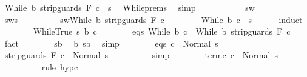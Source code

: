 \begin{isabellebody}
\ {\isachardoublequoteopen}{\isasymGamma}{\isasymturnstile}While\ b\ {\isacharparenleft}strip{\isacharunderscore}guards\ F\ c{\isacharparenright}\ {\isasymdown}\ s{\isachardoublequoteclose}\ \isamarkupfalse%
\ While{\isachardot}prems\ \isamarkupfalse%
\ simp\isanewline
\ \ \isamarkupfalse%
\isanewline
\ \ \isacommand{{\isacharbraceleft}}\isamarkupfalse%
\isanewline
\ \ \ \ \isamarkupfalse%
\ sw\ \ \isanewline
\ \ \ \ \isamarkupfalse%
\ {\isachardoublequoteopen}{\isasymGamma}{\isasymturnstile}sw{\isasymdown}s{\isachardoublequoteclose}\ \ \isanewline
\ \ \ \ \isamarkupfalse%
\ \isamarkupfalse%
\ {\isachardoublequoteopen}sw{\isacharequal}While\ b\ {\isacharparenleft}strip{\isacharunderscore}guards\ F\ c{\isacharparenright}\ {\isasymLongrightarrow}\ \isanewline
\ \ \ \ \ \ {\isasymGamma}{\isasymturnstile}While\ b\ c\ {\isasymdown}\ s{\isachardoublequoteclose}\isanewline
\ \ \ \ \isamarkupfalse%
\ {\isacharparenleft}induct{\isacharparenright}\isanewline
\ \ \ \ \ \ \isamarkupfalse%
\ {\isacharparenleft}WhileTrue\ s\ b{\isacharprime}\ c{\isacharprime}{\isacharparenright}\isanewline
\ \ \ \ \ \ \isamarkupfalse%
\ eqs{\isacharcolon}\ {\isachardoublequoteopen}While\ b{\isacharprime}\ c{\isacharprime}\ {\isacharequal}\ While\ b\ {\isacharparenleft}strip{\isacharunderscore}guards\ F\ c{\isacharparenright}{\isachardoublequoteclose}\ \isamarkupfalse%
\ fact\isanewline
\ \ \ \ \ \ \isamarkupfalse%
\ {\isacartoucheopen}s{\isasymin}b{\isacharprime}{\isacartoucheclose}\ \isamarkupfalse%
\ b{\isacharcolon}\ {\isachardoublequoteopen}s{\isasymin}b{\isachardoublequoteclose}\ \isamarkupfalse%
\ simp\isanewline
\ \ \ \ \ \ \isamarkupfalse%
\ eqs\ {\isacartoucheopen}{\isasymGamma}{\isasymturnstile}c{\isacharprime}\ {\isasymdown}\ Normal\ s{\isacartoucheclose}\ \isamarkupfalse%
\ {\isachardoublequoteopen}{\isasymGamma}{\isasymturnstile}strip{\isacharunderscore}guards\ F\ c\ {\isasymdown}\ Normal\ s{\isachardoublequoteclose}\isanewline
\ \ \ \ \ \ \ \ \isamarkupfalse%
\ simp\isanewline
\ \ \ \ \ \ \isamarkupfalse%
\ term{\isacharunderscore}c{\isacharcolon}\ {\isachardoublequoteopen}{\isasymGamma}{\isasymturnstile}c\ {\isasymdown}\ Normal\ s{\isachardoublequoteclose}\isanewline
\ \ \ \ \ \ \ \ \isamarkupfalse%
\ {\isacharparenleft}rule\ hyp{\isacharunderscore}c{\isacharparenright}\isanewline

\end{isabellebody}
